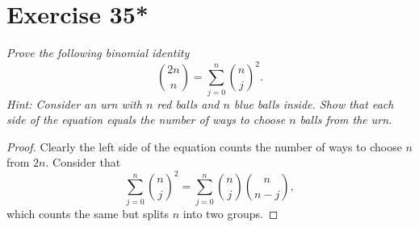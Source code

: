 \documentclass{abrice}
\begin{document}
\section{Exercise 35*}

\emph{Prove the following \emph{binomial identity}
  \[
  {2n \choose n} = \sum_{j=0}^n {n \choose j}^2.
  \]
  \emph{Hint}: Consider an urn with $n$ red balls and $n$ blue balls
  inside. Show that each side of the equation equals the number of
  ways to choose $n$ balls from the urn.}

\bigskip

\begin{proof}
  Clearly the left side of the equation counts the number of ways to
  choose $n$ from $2n$. Consider that
  \[
  \sum_{j=0}^n {n \choose j}^2 = \sum_{j=0}^n {n \choose j} {n \choose
  n-j},
  \]
  which counts the same but splits $n$ into two groups. 
\end{proof}
\end{document}
